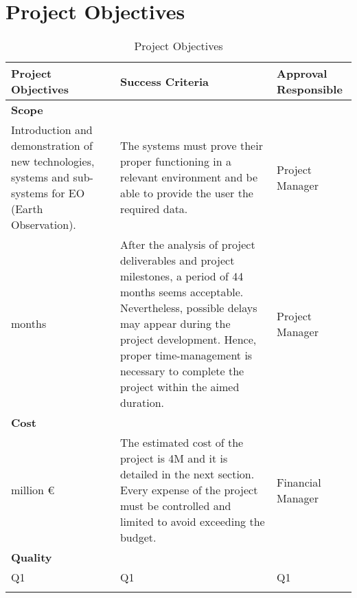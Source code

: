 \section{Project Objectives}
\begin{center}
	\begin{longtable}{>{\raggedright\arraybackslash}p{5cm} >{\raggedright\arraybackslash}p{5cm} >{\raggedleft\arraybackslash}p{2.5cm}}
		\toprule[2pt]
		\textbf{Project Objectives} & \textbf{Success Criteria} & \textbf{Approval Responsible} \\
		\midrule \endhead
		\textbf{Scope} &  &  \\
		\hline
		Introduction and demonstration of new technologies, systems and sub-systems for EO (Earth Observation). & The systems must prove their proper functioning in a relevant environment and be able to provide the user the required data. & Project Manager \\
		\hline
		44 months & After the analysis of project deliverables and project milestones, a period of 44 months seems acceptable. Nevertheless, possible delays may appear during the project development. Hence, proper time-management is necessary to complete the project within the aimed duration. & Project Manager  \\
		\hline
		\textbf{Cost} &  &   \\
		\hline
		4 million \euro & The estimated cost of the project is 4M  and it is detailed in the next section. Every expense of the project must be controlled and limited to avoid exceeding the budget. & Financial Manager  \\	
		\hline
		\textbf{Quality} &  &   \\
		\hline
		Q1 & Q1 & Q1  \\	
		\bottomrule[2pt]
		\caption{Project Objectives}
	\end{longtable}
\end{center}